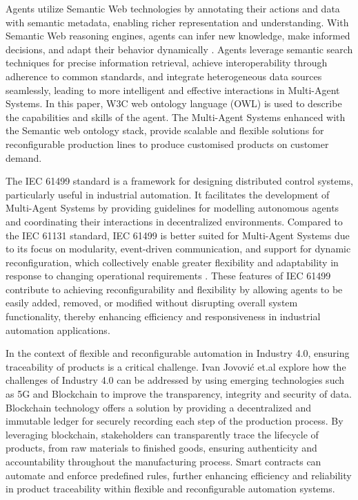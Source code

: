 \begin{bibunit}
Agents utilize Semantic Web technologies  \cite{aljosha_cap_skill_plug_play} by annotating their actions and data with semantic metadata, enabling richer representation and understanding. With Semantic Web reasoning engines, agents can infer new knowledge, make informed decisions, and adapt their behavior dynamically \cite{ochoa2023context}. Agents leverage semantic search techniques for precise information retrieval, achieve interoperability through adherence to common standards, and integrate heterogeneous data sources seamlessly, leading to more intelligent and effective interactions in Multi-Agent Systems. In this paper,  W3C web ontology language (OWL) \cite{hadzic2009ontology}  is used to describe the capabilities and skills of the agent. The Multi-Agent Systems enhanced with the Semantic web ontology stack, provide scalable and flexible solutions for reconfigurable production lines to produce customised products on customer demand.


The IEC 61499 standard \cite{iec61499part12012} is a framework for designing distributed control systems, particularly useful in industrial automation. It facilitates the development of Multi-Agent Systems by providing guidelines for modelling autonomous agents and coordinating their interactions in decentralized environments. Compared to the IEC 61131 standard, IEC 61499 is better suited for Multi-Agent Systems due to its focus on modularity, event-driven communication, and support for dynamic reconfiguration, which collectively enable greater flexibility and adaptability in response to changing operational requirements \cite{mulubika2013comparison}. These features of IEC 61499 contribute \cite{lyu2023multi} to achieving reconfigurability and flexibility by allowing agents to be easily added, removed, or modified without disrupting overall system functionality, thereby enhancing efficiency and responsiveness in industrial automation applications.


In the context of flexible and reconfigurable automation in Industry 4.0, ensuring traceability of products is a critical challenge. Ivan Jovović et.al \cite{jovovic2019innovative} explore how the challenges of Industry 4.0 can be addressed by using emerging technologies such as 5G and Blockchain to improve the transparency, integrity and security of data. Blockchain technology offers a solution by providing a decentralized and immutable ledger for securely recording each step of the production process. By leveraging blockchain, stakeholders can transparently trace the lifecycle of products, from raw materials to finished goods, ensuring authenticity and accountability throughout the manufacturing process. Smart contracts \cite{oliva2020exploratory} can automate and enforce predefined rules, further enhancing efficiency and reliability in product traceability within flexible and reconfigurable automation systems.


\end{bibunit}
